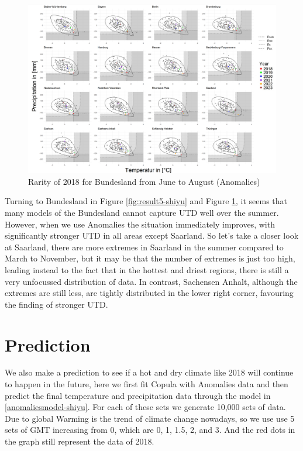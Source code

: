 \documentclass[
]{krantz}
\begin{document}
\begin{figure}

{\centering \includegraphics[width=0.8\linewidth]{work/03-compounds/figures/RESULTS/resultJJAA} 

}

\caption{Rarity of 2018 for Bundesland from June to August (Anomalies)}\label{fig:result6-shiyu}
\end{figure}

Turning to Bundesland in Figure \ref{fig:result5-shiyu} and Figure \ref{fig:result6-shiyu}, it seems that many models of the Bundesland cannot capture UTD well over the summer. However, when we use Anomalies the situation immediately improves, with significantly stronger UTD in all areas except Saarland. So let's take a closer look at Saarland, there are more extremes in Saarland in the summer compared to March to November, but it may be that the number of extremes is just too high, leading instead to the fact that in the hottest and driest regions, there is still a very unfocussed distribution of data. In contrast, Sachensen Anhalt, although the extremes are still less, are tightly distributed in the lower right corner, favouring the finding of stronger UTD.

\section{Prediction}\label{predicition-shiyu}

We also make a prediction to see if a hot and dry climate like 2018 will continue to happen in the future, here we first fit Copula with Anomalies data and then predict the final temperature and precipitation data through the model in \ref{anomaliesmodel-shiyu}. For each of these sets we generate 10,000 sets of data. Due to global Warming is the trend of climate change nowadays, so we use use 5 sets of GMT increasing from 0, which are 0, 1, 1.5, 2, and 3. And the red dots in the graph still represent the data of 2018.
\end{document}
